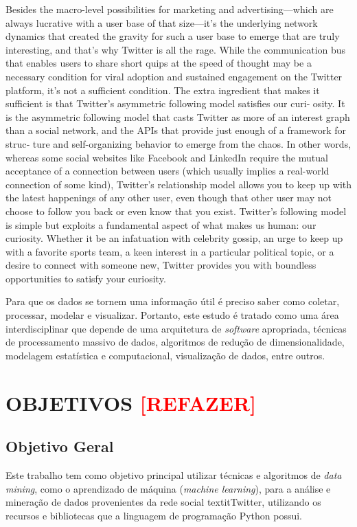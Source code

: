 Besides the macro-level possibilities for marketing and advertising—which are always lucrative with a user base of that size—it’s the underlying network dynamics that created the gravity for such a user base to emerge that are truly interesting, and that’s why Twitter is all the rage. While the communication bus that enables users to share short quips at the speed of thought may be a necessary condition for viral adoption and sustained engagement on the Twitter platform, it’s not a sufficient condition. The extra ingredient that makes it sufficient is that Twitter’s asymmetric following model satisfies our curi‐ osity. It is the asymmetric following model that casts Twitter as more of an interest graph than a social network, and the APIs that provide just enough of a framework for struc‐ ture and self-organizing behavior to emerge from the chaos.
In other words, whereas some social websites like Facebook and LinkedIn require the mutual acceptance of a connection between users (which usually implies a real-world connection of some kind), Twitter’s relationship model allows you to keep up with the latest happenings of any other user, even though that other user may not choose to follow you back or even know that you exist. Twitter’s following model is simple but exploits a fundamental aspect of what makes us human: our curiosity. Whether it be an infatuation with celebrity gossip, an urge to keep up with a favorite sports team, a keen interest in a particular political topic, or a desire to connect with someone new, Twitter provides you with boundless opportunities to satisfy your curiosity.


Para que os dados se tornem uma informação útil é preciso saber como coletar, processar, modelar e visualizar. Portanto, este estudo é tratado como uma área interdisciplinar que depende de uma arquitetura de \textit{software} apropriada, técnicas de processamento massivo de dados, algoritmos de redução de dimensionalidade, modelagem estatística e computacional, visualização de dados, entre outros.


\section{OBJETIVOS \textbf{\textcolor{red}{[REFAZER]}}}\label{sec:objetivos}

\subsection{Objetivo Geral} 
Este trabalho tem como objetivo principal utilizar técnicas e algoritmos de \textit{data mining}, como o aprendizado de máquina (\textit{machine learning}), para a análise e mineração de dados provenientes da rede social textit{Twitter}, utilizando os recursos e bibliotecas que a linguagem de programação Python possui.


